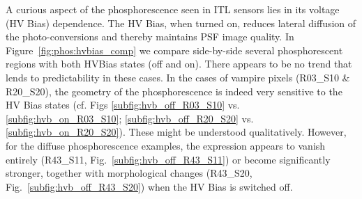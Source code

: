 A curious aspect of the phosphorescence seen in ITL sensors lies in its voltage (HV Bias) dependence. The HV Bias, when turned on, reduces lateral diffusion of the photo-conversions and thereby maintains PSF image quality. In Figure~\ref{fig:phos:hvbias_comp} we compare side-by-side several phosphorescent regions with both HVBias states (off and on). There appears to be no trend that lends to predictability in these cases. In the cases of vampire pixels (R03\_S10 \& R20\_S20), the geometry of the phosphorescence is indeed very sensitive to the HV Bias states (cf. Figs \ref{subfig:hvb_off_R03_S10} vs. \ref{subfig:hvb_on_R03_S10}; \ref{subfig:hvb_off_R20_S20} vs. \ref{subfig:hvb_on_R20_S20}). These might be understood qualitatively. However, for the diffuse phosphorescence examples, the expression appears to vanish entirely (R43\_S11, Fig.~\ref{subfig:hvb_off_R43_S11}) or become significantly stronger, together with morphological changes (R43\_S20, Fig.~\ref{subfig:hvb_off_R43_S20}) when the HV Bias is switched off.

